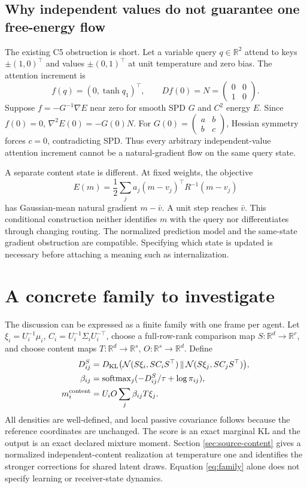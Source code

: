 \documentclass[11pt,letterpaper]{article}
\newcommand{\R}{\mathbb R}
\newcommand{\KL}{D_{\mathrm{KL}}}
\newcommand{\softmax}{\operatorname{softmax}}
\theoremstyle{remark}
\begin{document}
\subsection{Why independent values do not guarantee one free-energy flow}
The existing C5 obstruction is short. Let a variable query $q\in\R^2$ attend to keys $\pm(1,0)^\top$ and values $\pm(0,1)^\top$ at unit temperature and zero bias. The attention increment is
\begin{equation}
 f(q)=(0,\tanh q_1)^\top,\qquad Df(0)=
 N=\begin{pmatrix}0&0\\1&0\end{pmatrix}.
\end{equation}
Suppose $f=-G^{-1}\nabla E$ near zero for smooth SPD $G$ and $C^2$ energy $E$. Since $f(0)=0$, $\nabla^2E(0)=-G(0)N$. For $G(0)=\left(\begin{smallmatrix}a&b\\b&c\end{smallmatrix}\right)$, Hessian symmetry forces $c=0$, contradicting SPD. Thus every arbitrary independent-value attention increment cannot be a natural-gradient flow on the same query state.

A separate content state is different. At fixed weights, the objective
\begin{equation}
 E(m)=\frac12\sum_j a_j(m-v_j)^\top R^{-1}(m-v_j)
\end{equation}
has Gaussian-mean natural gradient $m-\bar v$. A unit step reaches $\bar v$. This conditional construction neither identifies $m$ with the query nor differentiates through changing routing. The normalized prediction model and the same-state gradient obstruction are compatible. Specifying which state is updated is necessary before attaching a meaning such as internalization.



\section{A concrete family to investigate}
\label{sec:family}
The discussion can be expressed as a finite family with one frame per agent. Let $\xi_i=U_i^{-1}\mu_i$, $C_i=U_i^{-1}\Sigma_iU_i^{-\top}$, choose a full-row-rank comparison map $S:\R^d\to\R^r$, and choose content maps $T:\R^d\to\R^s$, $O:\R^s\to\R^d$. Define
\begin{align}
 D^S_{ij}&=\KL\big(\mathcal N(S\xi_i,SC_iS^\top)
 \,\|\,\mathcal N(S\xi_j,SC_jS^\top)\big),\\
 \beta_{ij}&=\softmax_j(-D^S_{ij}/\tau+\log\pi_{ij}),\\
 m_i^{\rm content}&=U_iO\sum_j\beta_{ij}T\xi_j.
 \label{eq:family}
\end{align}
All densities are well-defined, and local passive covariance follows because the reference coordinates are unchanged. The score is an exact marginal KL and the output is an exact declared mixture moment. Section \ref{sec:source-content} gives a normalized independent-content realization at temperature one and identifies the stronger corrections for shared latent draws. Equation \eqref{eq:family} alone does not specify learning or receiver-state dynamics.
\end{document}
